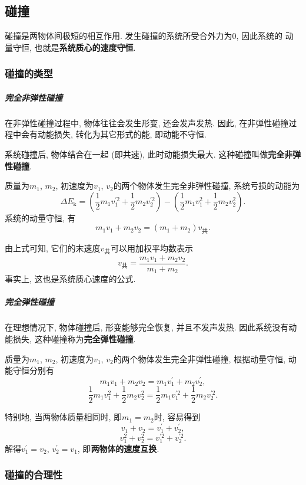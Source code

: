 \documentclass[12pt,a4paper]{ctexart}
\begin{document}
\subsection{碰撞}

碰撞是两物体间极短的相互作用. 发生碰撞的系统所受合外力为0, 因此系统的
动量守恒, 也就是\textbf{系统质心的速度守恒}.

\subsubsection{碰撞的类型}

\subparagraph{完全非弹性碰撞} 在非弹性碰撞过程中, 物体往往会发生形变, 还会发声发热.
因此, 在非弹性碰撞过程中会有动能损失, 转化为其它形式的能, 即动能不守恒.

系统碰撞后, 物体结合在一起 (即共速), 此时动能损失最大. 这种碰撞叫做\textbf{完全非弹性碰撞}.

质量为$m_1$, $m_2$, 初速度为$v_1$, $v_2$的两个物体发生完全非弹性碰撞,
系统亏损的动能为$$\Delta E_\mathrm{k} = \left(\frac12 m_1 v_1^{\prime 2} + \frac12 m_2 v_2^{\prime 2}\right) - \left(\frac12 m_1 v_1^2 + \frac12 m_2 v_2^2\right).$$
系统的动量守恒, 有$$m_1v_1 + m_2v_2 = (m_1+m_2)v_\text{共}.$$

由上式可知, 它们的末速度$v_\text{共}$可以用加权平均数表示
\begin{equation}
    v_\text{共} = \frac{m_1v_1 + m_2v_2}{m_1+m_2}.
\end{equation}
事实上, 这也是系统质心速度的公式.

\subparagraph{完全弹性碰撞} 在理想情况下, 物体碰撞后, 形变能够完全恢复, 并且不发声发热.
因此系统没有动能损失, 这种碰撞称为\textbf{完全弹性碰撞}.

质量为$m_1$, $m_2$, 初速度为$v_1$, $v_2$的两个物体发生完全非弹性碰撞,
根据动量守恒, 动能守恒分别有
$$m_1v_1 + m_2v_2 = m_1v_1^{\prime} + m_2v_2^{\prime}, $$
$$\displaystyle\frac12 m_1 v_1^2 + \displaystyle\frac12 m_2 v_2^2 = \displaystyle\frac12 m_1 v_1^{\prime 2} + \displaystyle\frac12 m_2 v_2^{\prime 2}.$$


特别地, 当两物体质量相同时, 即$m_1 = m_2$时, 容易得到$$v_1 + v_2 = v_1^{\prime}+ v_2^{\prime},$$
$$v_1^2 + v_2^2 = v_1^{\prime 2}+ v_2^{\prime 2}.$$
解得$v_1^{\prime} = v_2$, $v_2^{\prime} = v_1$, 即\textbf{两物体的速度互换}.

\subsubsection{碰撞的合理性}
\end{document}

